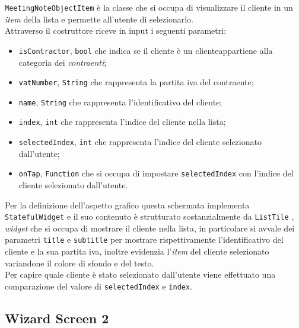 \lstinline{MeetingNoteObjectItem} è la classe che si occupa di visualizzare il cliente in un \emph{item} della lista e permette all'utente di selezionarlo. \\
Attraverso il costruttore riceve in input i seguenti parametri:
\begin{itemize}
    \item \lstinline{isContractor}, \lstinline{bool} che indica se il cliente è un \gls{cliente}\glsoccur appartiene alla categoria dei \emph{contraenti};
    \item \lstinline{vatNumber}, \lstinline{String} che rappresenta la partita iva del contraente;
    \item \lstinline{name}, \lstinline{String} che rappresenta l'identificativo del cliente;
    \item \lstinline{index}, \lstinline{int} che rappresenta l'indice del cliente nella lista;
    \item \lstinline{selectedIndex}, \lstinline{int} che rappresenta l'indice del cliente selezionato dall'utente;
    \item \lstinline{onTap}, \lstinline{Function} che si occupa di impostare \lstinline{selectedIndex} con l'indice del cliente selezionato dall'utente.
\end{itemize}
Per la definizione dell'aspetto grafico questa schermata implementa \lstinline{StatefulWidget} e il suo contenuto è strutturato sostanzialmente da \lstinline{ListTile} \cite{site:list-tile}, \emph{widget} che si occupa di mostrare il cliente nella lista, in particolare si avvale dei parametri \lstinline{title} e \lstinline{subtitle} per mostrare rispettivamente l'identificativo del cliente e la sua partita iva, inoltre evidenzia l'\emph{item} del cliente selezionato variandone il colore di sfondo e del testo.\\
Per capire quale cliente è stato selezionato dall'utente viene effettuato una comparazione del valore di \lstinline{selectedIndex} e \lstinline{index}.

\subsection{Wizard Screen 2}
\label{subsec:wizard-screen-2}


